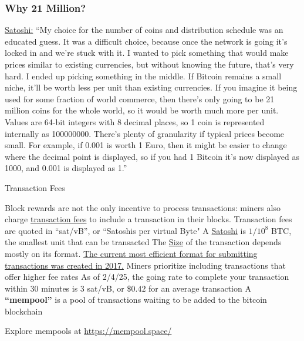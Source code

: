 \documentclass[aspectratio=169]{beamer}
\begin{document}
\begin{frame}
	\frametitle{Why 21 Million?}
	
	\footnotesize
	
	\href{https://mmalmi.github.io/satoshi/}{Satoshi:} ``My choice for the number of coins and distribution schedule was an 
	educated guess.  It was a difficult choice, because once the network is 
	going it's locked in and we're stuck with it.  I wanted to pick 
	something that would make prices similar to existing currencies, but 
	without knowing the future, that's very hard.  I ended up picking 
	something in the middle.  If Bitcoin remains a small niche, it'll be 
	worth less per unit than existing currencies.  If you imagine it being 
	used for some fraction of world commerce, then there's only going to be 
	21 million coins for the whole world, so it would be worth much more per 
	unit.  Values are 64-bit integers with 8 decimal places, so 1 coin is 
	represented internally as 100000000.  There's plenty of granularity if 
	typical prices become small.  For example, if 0.001 is worth 1 Euro, 
	then it might be easier to change where the decimal point is displayed, 
	so if you had 1 Bitcoin it's now displayed as 1000, and 0.001 is 
	displayed as 1.''
	
\end{frame}



\begin{frame}{Transaction Fees}

\bi 
\m Block rewards are not the only incentive to process transactions: miners also charge \ul{transaction fees} to include a transaction in their blocks. \pause 
\m Transaction fees are quoted in ``sat/vB'', or ``Satoshis per virtual Byte" 
\bi 
\m A \ul{Satoshi} is $1/10^8$ BTC, the smallest unit that can be transacted \pause 
\m The \ul{Size} of the transaction depends mostly on its format. \href{https://mempool.space/docs/faq}{The current most efficient format for submitting transactions was created in 2017.} \pause 
\ei
\m Miners prioritize including transactions that offer higher fee rates 
\m As of 2/4/25, the going rate to complete your transaction within 30 minutes is 3 sat/vB, or	$\$0.42$ for an average transaction \pause 
\m A \textbf{``mempool''} is a pool of transactions waiting to be added to the bitcoin blockchain 
\ei 

Explore mempools at \hyperlink{https://mempool.space/}{https://mempool.space/}
    
\end{frame}
\end{document}
